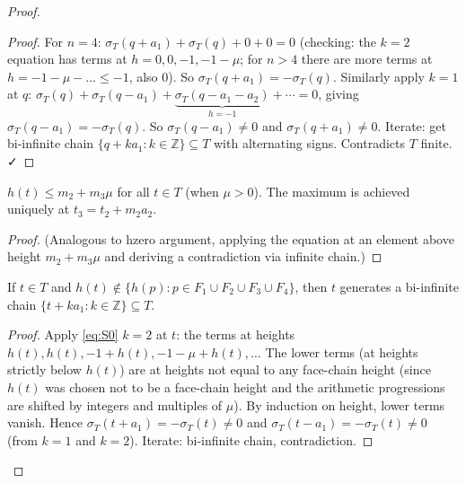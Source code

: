 \begin{proof}
\begin{proof}
For $n=4$: $\sigma_T(q+a_1)+\sigma_T(q)+0+0=0$ (checking: the $k=2$ equation has terms at $h = 0, 0, -1, -1-\mu$; for $n>4$ there are more terms at $h=-1-\mu-\ldots \leq -1$, also $0$). So $\sigma_T(q+a_1) = -\sigma_T(q)$. Similarly apply $k=1$ at $q$: $\sigma_T(q)+\sigma_T(q-a_1)+\underbrace{\sigma_T(q-a_1-a_2)}_{h=-1}+\cdots=0$, giving $\sigma_T(q-a_1)=-\sigma_T(q)$. So $\sigma_T(q-a_1) \neq 0$ and $\sigma_T(q+a_1) \neq 0$. Iterate: get bi-infinite chain $\{q + k a_1 : k \in \mathbb{Z}\} \subseteq T$ with alternating signs. Contradicts $T$ finite. ✓
\end{proof}

\begin{lemma}[betamax4]\label{lem:betamax4}
$h(t) \leq m_2 + m_3\mu$ for all $t \in T$ (when $\mu > 0$). The maximum is achieved uniquely at $t_3 = t_2 + m_2 a_2$.
\end{lemma}
\begin{proof}
(Analogous to hzero argument, applying the equation at an element above height $m_2+m_3\mu$ and deriving a contradiction via infinite chain.)
\end{proof}

\begin{lemma}[facechain]\label{lem:facechain}
If $t \in T$ and $h(t) \notin \{h(p) : p \in F_1 \cup F_2 \cup F_3 \cup F_4\}$, then $t$ generates a bi-infinite chain $\{t + k a_1 : k \in \mathbb{Z}\} \subseteq T$.
\end{lemma}
\begin{proof}
Apply \eqref{eq:S0} $k=2$ at $t$: the terms at heights $h(t),h(t),-1+h(t),-1-\mu+h(t),\ldots$ The lower terms (at heights strictly below $h(t)$) are at heights not equal to any face-chain height (since $h(t)$ was chosen not to be a face-chain height and the arithmetic progressions are shifted by integers and multiples of $\mu$). By induction on height, lower terms vanish. Hence $\sigma_T(t+a_1)=-\sigma_T(t) \neq 0$ and $\sigma_T(t-a_1)=-\sigma_T(t) \neq 0$ (from $k=1$ and $k=2$). Iterate: bi-infinite chain, contradiction.
\end{proof}


\end{proof}
